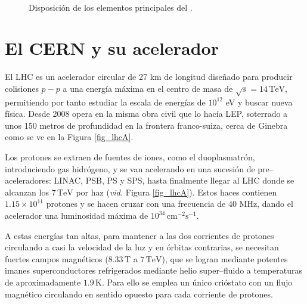 \vspace*{\fill}

\begin{figure}[H]
\centering
{} \\ \vfill
{} \vfill
\caption{Disposición de los elementos principales del \lhc.} \label{fig_lhc}
\end{figure}

\vspace*{\fill}

\newpage


\section{El CERN y su acelerador \lhc} %


El LHC es un acelerador circular de 27 km de longitud diseñado para producir colisiones $p-p$ a una energía máxima en el centro de masa de $\sqrt{s} = 14 \, \mathrm{TeV}$, permitiendo por tanto estudiar la escala de energías de $10^{12}$ eV y buscar nueva física. \color{vero} Desde 2008 opera en la misma obra civil que lo hacía LEP, \color{norm} soterrado a unos 150 metros de profundidad en la frontera franco-suiza, cerca de Ginebra como se ve en la Figura \ref{fig_lhcA}.

Los protones se extraen de fuentes de iones, como el duoplasmatrón, introduciendo gas hidrógeno,
y se van acelerando en una sucesión de  pre--aceleradores: LINAC, PSB, PS y  SPS, hasta finalmente llegar al LHC donde se alcanzan los $7 \, \mathrm{TeV}$ por haz (\emph{vid.} Figura \ref{fig_lhcA}).
%
Estos haces contienen $1.15 \times  10^{11}$ protones y se hacen cruzar con una frecuencia de $40$ MHz, dando el acelerador una luminosidad máxima de $10^{34} \, \mathrm{cm^{-2}s^{-1}}$.


A estas energías tan altas, para mantener a las dos corrientes de protones circulando a casi la velocidad de la luz y en órbitas contrarias, se necesitan fuertes campos magnéticos ($8.33 \, \mathrm{T}$ a $7 \, \mathrm{TeV}$), que se logran mediante potentes imanes superconductores refrigerados mediante helio super--fluido a  temperaturas de aproximadamente $1.9 \, \text{K}$. Para ello se  emplea un único crióstato con un flujo magnético circulando en sentido opuesto para cada corriente de protones.
 






